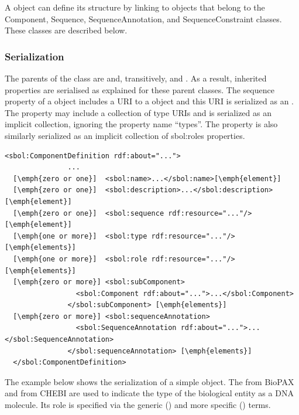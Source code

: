 
A  object can define its structure by linking to objects that belong to the Component, Sequence, SequenceAnnotation, and SequenceConstraint classes. These classes are described below.

\subsubsection*{Serialization}
The parents of the  class are  and, transitively,  and . As a result, inherited properties are serialised as explained for these parent classes. The sequence property of a  object includes a URI to a  object and this URI is serialized as an . The  property may include a collection of type URIs and is serialized as an implicit collection, ignoring the property name ``types''. The  property is also similarly serialized as an implicit collection of sbol:roles properties.

\begin{lstlisting}
<sbol:ComponentDefinition rdf:about="...">
               ...
  [\emph{zero or one}]  <sbol:name>...</sbol:name>[\emph{element}]
  [\emph{zero or one}]  <sbol:description>...</sbol:description>[\emph{element}]
  [\emph{zero or one}]  <sbol:sequence rdf:resource="..."/>[\emph{element}]
  [\emph{one or more}]  <sbol:type rdf:resource="..."/>  [\emph{elements}]
  [\emph{one or more}]  <sbol:role rdf:resource="..."/>  [\emph{elements}]    
  [\emph{zero or more}] <sbol:subComponent>
                 <sbol:Component rdf:about="...">...</sbol:Component>
               </sbol:subComponent> [\emph{elements}]
  [\emph{zero or more}] <sbol:sequenceAnnotation>
                 <sbol:SequenceAnnotation rdf:about="...">...</sbol:SequenceAnnotation>
               </sbol:sequenceAnnotation> [\emph{elements}]        
  </sbol:ComponentDefinition>
\end{lstlisting}

The example below shows the serialization of a simple  object. The  from BioPAX and  from CHEBI are used to indicate the type of the biological entity as a DNA molecule. Its role is specified via the generic  () and more specific  () terms.

